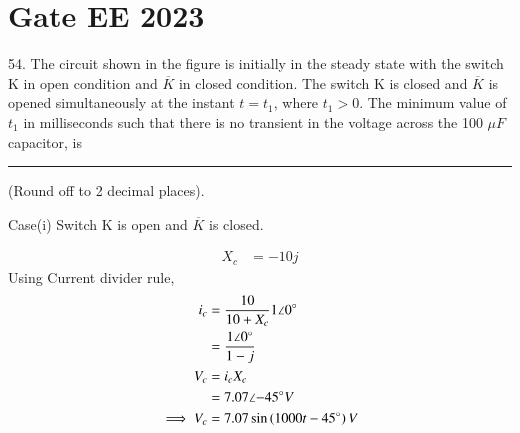\documentclass[journal,12pt,twocolumn]{IEEEtran}
\begin{document}


\vspace{3cm}

\title{}
\author{EE23BTECH11054 -  Sai Krishna Shanigarapu$^{*}$
}
\maketitle
\newpage
\bigskip


\section*{Gate EE 2023}
54. \hspace{2pt}The circuit shown in the figure is initially in the steady state with the switch K in open condition and $\overline{K}$ in closed condition. The switch K is closed and $\overline{K}$ is opened simultaneously at the instant $t = t_1$, where $t_1 > 0$. The minimum value of $t_1$ in milliseconds such that there is no transient in the voltage across the 100 $\mu F$ capacitor, is \rule{1cm}{0.15mm} (Round off to 2 decimal places).

\begin{figure}[h!]
  \centering
  \resizebox{0.8\columnwidth}{!}{}
\end{figure}

\solution

Case(i) Switch K is open and $\overline{K}$ is closed.
\begin{figure}[h!]
  \centering
  \resizebox{0.50\columnwidth}{!}{}
\end{figure}

\begin{align}
    X_c &= -10j
\end{align}
Using Current divider rule,
\begin{align}
    i_c &= \frac{10}{10 + X_c} 1 \angle 0^\circ\\
    &= \frac{1\angle 0^\circ}{1-j}\\
    V_c &= i_c X_c\\
    &= 7.07\angle{-45^\circ} V\\
    \implies V_c &= 7.07\sin \left(1000t - 45^\circ\right)V
\end{align}

%    
\end{document}
